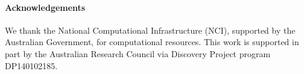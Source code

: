 {
\setlength{\parindent}{0cm}
\paragraph{\bf Acknowledgements}
We thank the National Computational Infrastructure (NCI), supported by the Australian Government, for computational resources.
This work is supported in part by the Australian Research Council via Discovery Project program DP140102185.
}
\vspace{-1em}